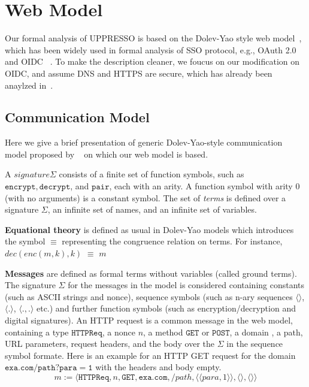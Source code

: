 \section{Web Model}

Our formal analysis of UPPRESSO is based on the Dolev-Yao style web model~\cite{SPRESSO}, which has been widely used in formal analysis of SSO protocol, e.g., OAuth 2.0~\cite{FettKS16} and OIDC ~\cite{FettKS17}.
To make the description cleaner, we foucus on our modification on OIDC, and assume DNS and HTTPS are secure, which has already been anaylzed in~\cite{SPRESSO}.
\subsection{Communication Model}
Here we give a brief  presentation of generic Dolev-Yao-style communication model proposed by ~\cite{SPRESSO} on which our web model  is based. 

A $signature \Sigma$ consists of a finite set of function symbols, such as $\mathtt{encrypt}, \mathtt{decrypt}$, and $\mathtt{pair}$, each with an arity. A function symbol with arity 0 (with no arguments)  is a constant symbol.
The set of \emph{terms} is defined over a signature $\Sigma$, an infinite set of names, and an infinite set of variables.

\vspace{1mm}\noindent\textbf{Equational theory } is defined as usual in Dolev-Yao models which introduces the symbol $\equiv$ representing the congruence relation on terms. For instance,  $dec(enc(m, k), k)$ $\equiv$ $m$


\vspace{1mm}\noindent\textbf{Messages  } are defined as formal terms without variables (called ground terms). The signature $\Sigma$ for the messages in the model is considered containing constants (such as ASCII strings and nonce), sequence symbols (such as n-ary sequences $\langle \rangle$, $\langle . \rangle$, $\langle . ,. \rangle$ etc.) and further function symbols (such as encryption/decryption and digital signatures). An HTTP request is a common message in the web model, containing a type $\mathtt{HTTPReq}$, a nonce $n$, a method  $\mathtt{GET}$ or $\mathtt{POST}$,  a domain , a path, URL parameters, request headers, and the body  over the $\Sigma$ in the sequence symbol formate. Here is an example for an HTTP GET request for the domain  $\mathtt{exa.com/path?para=1}$ with the headers and body empty.
\begin{equation*}
    m:=\langle\mathtt{HTTPReq},n,\mathtt{GET},\mathtt{exa.com},/path,\langle \langle para, 1\rangle \rangle ,\langle \rangle,\langle \rangle \rangle
\end{equation*}

